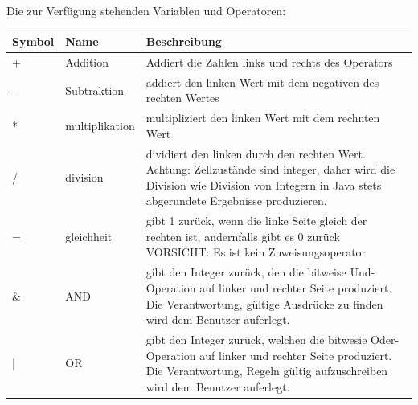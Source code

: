 \documentclass[11pt,a4paper]{article}
\begin{document}
\par
Die zur Verfügung stehenden Variablen und Operatoren:
\par
\begin{longtable}[m]{|m{2cm}|m{2.5cm}|m{6.5cm}|}
\hline
Symbol&Name&Beschreibung\\
\hline
+ & Addition & Addiert die Zahlen links und rechts des Operators\\
\hline
- & Subtraktion & addiert den linken Wert mit dem negativen des rechten Wertes\\
\hline
* & multiplikation & multipliziert den linken Wert mit dem rechnten Wert\\
\hline
/ & division & dividiert den linken durch den rechten Wert. Achtung: Zellzustände sind integer, daher wird die Division wie Division von Integern in Java stets abgerundete Ergebnisse produzieren.\\
\hline
= & gleichheit & gibt 1 zurück, wenn die linke Seite gleich der rechten ist, andernfalls gibt es 0 zurück VORSICHT: Es ist kein Zuweisungsoperator\\ 
\hline

\&  & AND & gibt den Integer zurück, den die bitweise Und-Operation auf linker und rechter Seite produziert. Die Verantwortung, gültige Ausdrücke zu finden wird dem Benutzer auferlegt.\\
\hline
| & OR & gibt den Integer zurück, welchen die bitwesie Oder-Operation auf linker und rechter Seite produziert. Die Verantwortung, Regeln gültig aufzuschreiben wird dem Benutzer auferlegt.\\


\end{longtable}
\end{document}
